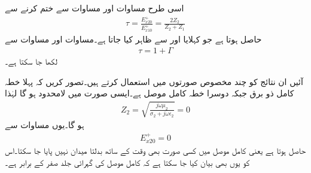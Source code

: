 اسی طرح مساوات  اور مساوات  سے  ختم کرنے سے
\begin{align}\label{مساوات_موج_شرح_ترسیل_تعریف}
\tau=\frac{E_{x20}^+}{E_{x10}^+ }=\frac{2Z_2}{Z_2+Z_1}
\end{align}
حاصل ہوتا ہے جو   کہلایا اور  سے ظاہر کیا جاتا ہے۔مساوات  اور مساوات  سے
\begin{align}
\tau=1+\Gamma
\end{align}
لکھا جا سکتا ہے۔

آئیں ان نتائج کو چند مخصوص صورتوں میں استعمال کرتے ہیں۔تصور کریں کہ پہلا خطہ کامل ذو برق جبکہ دوسرا خطہ کامل موصل ہے۔ایسی صورت میں  لامحدود ہو گا لہٰذا
\begin{align*}
Z_2=\sqrt{\frac{j \omega \mu_2}{\sigma_2+j\omega \epsilon_2}}=0
\end{align*} 
ہو گا۔یوں مساوات  سے 
\begin{align*}
E_{x20}^+=0
\end{align*}
حاصل ہوتا ہے یعنی کامل موصل میں کسی صورت بھی وقت کے ساتھ بدلتا میدان نہیں پایا جا سکتا۔اس کو یوں بھی بیان کیا جا سکتا ہے کہ کامل موصل کی گہرائی جلد صفر کے برابر ہے۔

